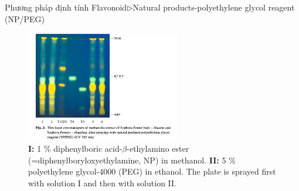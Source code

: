 \documentclass[11pt]{beamer}
\begin{document}
\begin{frame}{Phương pháp định tính Flavonoid$\rhd$Natural products-polyethylene glycol reagent (NP/PEG)}
    \begin{figure}
        \centering
        \includegraphics[width=0.6\textwidth]{Sophora flower buds Flavonoid.png}
        \caption{\tiny {\bf I:} 1 \% diphenylboric acid-$\beta$-ethylamino ester (=diphenylboryloxyethylamine, NP) in methanol. 
		{\bf II:} 5 \% polyethylene glycol-4000 (PEG) in ethanol.
        The plate is sprayed first with solution I and then with solution II.}
    \end{figure}
\end{frame}
\end{document}
